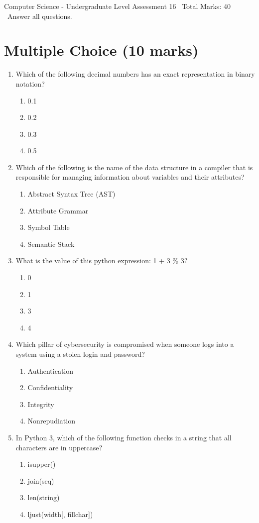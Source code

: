 \documentclass[12pt]{article}
\begin{document}
\begin{center}
Computer Science - Undergraduate Level Assessment 16 \
Total Marks: 40 \
Answer all questions.
\end{center}

\section*{Multiple Choice (10 marks)}
\begin{enumerate}[label=\arabic*.]
\item Which of the following decimal numbers has an exact representation in binary notation?
\begin{enumerate}[label=(\alph*)]
    \item 0.1
    \item 0.2
    \item 0.3
    \item 0.5
\end{enumerate}
\item Which of the following is the name of the data structure in a compiler that is responsible for managing information about variables and their attributes?
\begin{enumerate}[label=(\alph*)]
    \item Abstract Syntax Tree (AST)
    \item Attribute Grammar
    \item Symbol Table
    \item Semantic Stack
\end{enumerate}
\item What is the value of this python expression: 1 + 3 \% 3?
\begin{enumerate}[label=(\alph*)]
    \item 0
    \item 1
    \item 3
    \item 4
\end{enumerate}
\item Which pillar of cybersecurity is compromised when someone logs into a system using a stolen login and password?
\begin{enumerate}[label=(\alph*)]
    \item Authentication
    \item Confidentiality
    \item Integrity
    \item Nonrepudiation
\end{enumerate}
\item In Python 3, which of the following function checks in a string that all characters are in uppercase?
\begin{enumerate}[label=(\alph*)]
    \item isupper()
    \item join(seq)
    \item len(string)
    \item ljust(width[, fillchar])
\end{enumerate}
\end{enumerate}
\end{document}

